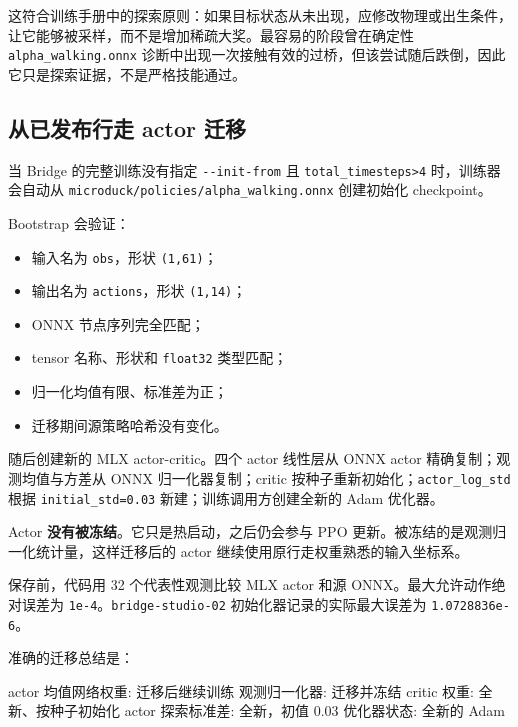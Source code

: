 \documentclass[
  chinese,
  11pt,
  letterpaper,
]{article}
\newenvironment{Shaded}{\begin{snugshade}}{\end{snugshade}}
\newcommand{\NormalTok}[1]{#1}
\providecommand{\tightlist}{%
  \setlength{\itemsep}{0pt}\setlength{\parskip}{0pt}}
\renewenvironment{Shaded}{\par\smallskip}{\par\smallskip}
\begin{document}
\endgroup

这符合训练手册中的探索原则：如果目标状态从未出现，应修改物理或出生条件，让它能够被采样，而不是增加稀疏大奖。最容易的阶段曾在确定性
\texttt{alpha\_\allowbreak{}walking.\allowbreak{}onnx}
诊断中出现一次接触有效的过桥，但该尝试随后跌倒，因此它只是探索证据，不是严格技能通过。

\subsection{从已发布行走 actor
迁移}\label{ux4eceux5df2ux53d1ux5e03ux884cux8d70-actor-ux8fc1ux79fb}

当 Bridge 的完整训练没有指定 \texttt{-\/-init-from} 且
\texttt{total\_timesteps\textgreater{}4} 时，训练器会自动从
\texttt{microduc\allowbreak{}k/\allowbreak{}policies\allowbreak{}/\allowbreak{}alpha\_\allowbreak{}walking.\allowbreak{}onnx}
创建初始化 checkpoint。

Bootstrap 会验证：

\begin{itemize}
\tightlist
\item
  输入名为 \texttt{obs}，形状 \texttt{(1,61)}；
\item
  输出名为 \texttt{actions}，形状 \texttt{(1,14)}；
\item
  ONNX 节点序列完全匹配；
\item
  tensor 名称、形状和 \texttt{float32} 类型匹配；
\item
  归一化均值有限、标准差为正；
\item
  迁移期间源策略哈希没有变化。
\end{itemize}

随后创建新的 MLX actor-critic。四个 actor 线性层从 ONNX actor
精确复制；观测均值与方差从 ONNX 归一化器复制；critic
按种子重新初始化；\texttt{actor\_\allowbreak{}log\_\allowbreak{}std}
根据 \texttt{initial\_std=0.03} 新建；训练调用方创建全新的 Adam 优化器。

Actor \textbf{没有被冻结}。它只是热启动，之后仍会参与 PPO
更新。被冻结的是观测归一化统计量，这样迁移后的 actor
继续使用原行走权重熟悉的输入坐标系。

保存前，代码用 32 个代表性观测比较 MLX actor 和源
ONNX。最大允许动作绝对误差为
\texttt{1e-4}。\texttt{bridge-\allowbreak{}studio-\allowbreak{}02}
初始化器记录的实际最大误差为 \texttt{1.0728836e-6}。

准确的迁移总结是：

\begingroup\setmonofont{PingFang SC}

\begin{Shaded}
\begin{Highlighting}[]
\NormalTok{actor 均值网络权重:    迁移后继续训练}
\NormalTok{观测归一化器:          迁移并冻结}
\NormalTok{critic 权重:           全新、按种子初始化}
\NormalTok{actor 探索标准差:      全新，初值 0.03}
\NormalTok{优化器状态:            全新的 Adam}
\end{Highlighting}
\end{Shaded}
\end{document}
